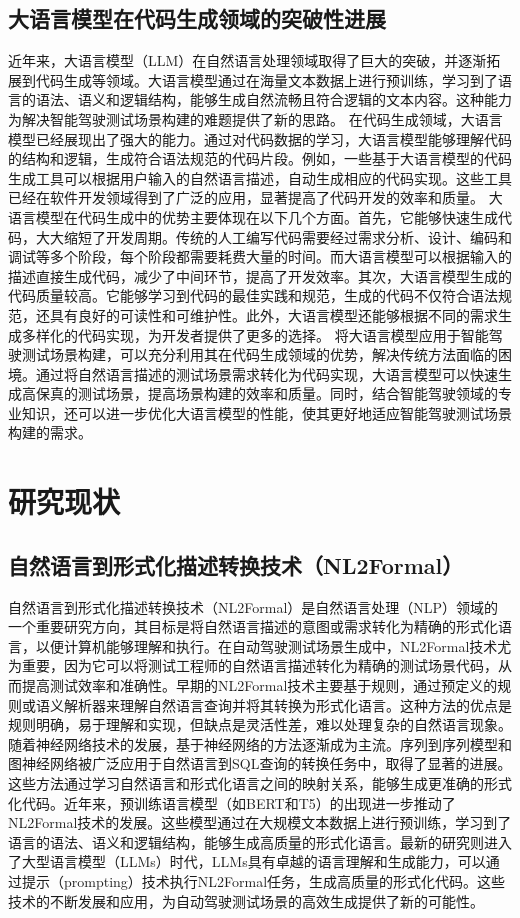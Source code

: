 \subsection{大语言模型在代码生成领域的突破性进展}
近年来，大语言模型（LLM）在自然语言处理领域取得了巨大的突破，并逐渐拓展到代码生成等领域。大语言模型通过在海量文本数据上进行预训练，学习到了语言的语法、语义和逻辑结构，能够生成自然流畅且符合逻辑的文本内容。这种能力为解决智能驾驶测试场景构建的难题提供了新的思路。
在代码生成领域，大语言模型已经展现出了强大的能力。通过对代码数据的学习，大语言模型能够理解代码的结构和逻辑，生成符合语法规范的代码片段。例如，一些基于大语言模型的代码生成工具可以根据用户输入的自然语言描述，自动生成相应的代码实现。这些工具已经在软件开发领域得到了广泛的应用，显著提高了代码开发的效率和质量。
大语言模型在代码生成中的优势主要体现在以下几个方面。首先，它能够快速生成代码，大大缩短了开发周期。传统的人工编写代码需要经过需求分析、设计、编码和调试等多个阶段，每个阶段都需要耗费大量的时间。而大语言模型可以根据输入的描述直接生成代码，减少了中间环节，提高了开发效率。其次，大语言模型生成的代码质量较高。它能够学习到代码的最佳实践和规范，生成的代码不仅符合语法规范，还具有良好的可读性和可维护性。此外，大语言模型还能够根据不同的需求生成多样化的代码实现，为开发者提供了更多的选择。
将大语言模型应用于智能驾驶测试场景构建，可以充分利用其在代码生成领域的优势，解决传统方法面临的困境。通过将自然语言描述的测试场景需求转化为代码实现，大语言模型可以快速生成高保真的测试场景，提高场景构建的效率和质量。同时，结合智能驾驶领域的专业知识，还可以进一步优化大语言模型的性能，使其更好地适应智能驾驶测试场景构建的需求。


\section{研究现状}
\subsection{自然语言到形式化描述转换技术（NL2Formal）}
自然语言到形式化描述转换技术（NL2Formal）是自然语言处理（NLP）领域的一个重要研究方向，其目标是将自然语言描述的意图或需求转化为精确的形式化语言，以便计算机能够理解和执行。在自动驾驶测试场景生成中，NL2Formal技术尤为重要，因为它可以将测试工程师的自然语言描述转化为精确的测试场景代码，从而提高测试效率和准确性。早期的NL2Formal技术主要基于规则，通过预定义的规则或语义解析器来理解自然语言查询并将其转换为形式化语言。这种方法的优点是规则明确，易于理解和实现，但缺点是灵活性差，难以处理复杂的自然语言现象。随着神经网络技术的发展，基于神经网络的方法逐渐成为主流。序列到序列模型和图神经网络被广泛应用于自然语言到SQL查询的转换任务中，取得了显著的进展。这些方法通过学习自然语言和形式化语言之间的映射关系，能够生成更准确的形式化代码。近年来，预训练语言模型（如BERT和T5）的出现进一步推动了NL2Formal技术的发展。这些模型通过在大规模文本数据上进行预训练，学习到了语言的语法、语义和逻辑结构，能够生成高质量的形式化语言。最新的研究则进入了大型语言模型（LLMs）时代，LLMs具有卓越的语言理解和生成能力，可以通过提示（prompting）技术执行NL2Formal任务，生成高质量的形式化代码。这些技术的不断发展和应用，为自动驾驶测试场景的高效生成提供了新的可能性。

